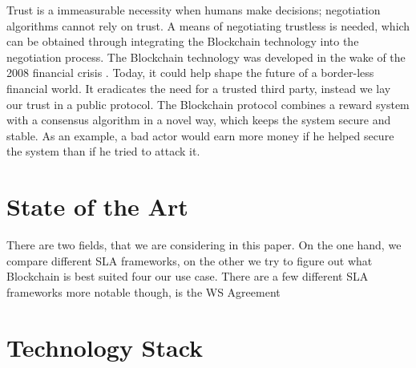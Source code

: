 Trust is a immeasurable necessity when humans make decisions; negotiation algorithms cannot rely on trust. A means of negotiating trustless is needed, which can be obtained through integrating the Blockchain technology into the negotiation process. The Blockchain technology was developed in the wake of the 2008 financial crisis \cite{nakamoto2008bitcoin}. Today, it could help shape the future of a border-less financial world. It eradicates the need for a trusted third party, instead we lay our trust in a public protocol. The Blockchain protocol combines a reward system with a consensus algorithm in a novel way, which keeps the system secure and stable. As an example, a bad actor would earn more money if he helped secure the system than if he tried to attack it.



\chapter{State of the Art}

There are two fields, that we are considering in this paper. On the one hand, we compare different SLA frameworks, on the other we try to figure out what Blockchain is best suited four our use case. There are a few different SLA frameworks more notable though, is the WS Agreement   






\chapter{Technology Stack}

